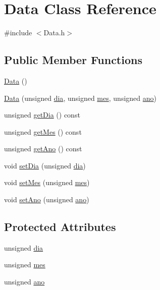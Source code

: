 \hypertarget{class_data}{\section{Data Class Reference}
\label{class_data}
}


{\ttfamily \#include $<$Data.\+h$>$}

\subsection*{Public Member Functions}
\begin{DoxyCompactItemize}
\item 
\hyperlink{class_data_af11f741cb7f587e2e495452a8905a22a}{Data} ()
\item 
\hyperlink{class_data_ab1e8f6ca4094cbf13062f243fa2bb90b}{Data} (unsigned \hyperlink{class_data_afd7c86fbe8808298e8ac555d15374c97}{dia}, unsigned \hyperlink{class_data_a52f02cba5bf54c79dc1dd93545d27e5f}{mes}, unsigned \hyperlink{class_data_a662fc8d7cc87332b0204470c21b08383}{ano})
\item 
unsigned \hyperlink{class_data_a07fe748ec046cb904c6854fb8b792786}{get\+Dia} () const 
\item 
unsigned \hyperlink{class_data_a070387c9894b966ec8a175e3eb3c9c06}{get\+Mes} () const 
\item 
unsigned \hyperlink{class_data_a31f649c5a854de4750506a163955bb0b}{get\+Ano} () const 
\item 
void \hyperlink{class_data_ab3ea08211198373060bfd9aa7530ddff}{set\+Dia} (unsigned \hyperlink{class_data_afd7c86fbe8808298e8ac555d15374c97}{dia})
\item 
void \hyperlink{class_data_ac886172612a1bd81f1d266c4f5f94377}{set\+Mes} (unsigned \hyperlink{class_data_a52f02cba5bf54c79dc1dd93545d27e5f}{mes})
\item 
void \hyperlink{class_data_a5ad712f23c932ee4d515213f7c66f60e}{set\+Ano} (unsigned \hyperlink{class_data_a662fc8d7cc87332b0204470c21b08383}{ano})
\end{DoxyCompactItemize}
\subsection*{Protected Attributes}
\begin{DoxyCompactItemize}
\item 
unsigned \hyperlink{class_data_afd7c86fbe8808298e8ac555d15374c97}{dia}
\item 
unsigned \hyperlink{class_data_a52f02cba5bf54c79dc1dd93545d27e5f}{mes}
\item 
unsigned \hyperlink{class_data_a662fc8d7cc87332b0204470c21b08383}{ano}
\end{DoxyCompactItemize}


